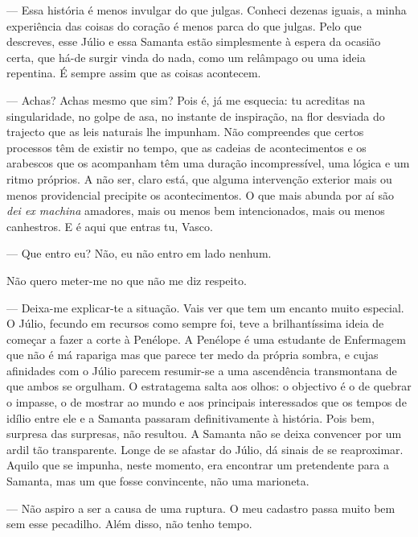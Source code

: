 --- Essa história é menos invulgar do que julgas. Conheci dezenas iguais,
  a minha experiência das coisas do coração é menos parca do que julgas.
  Pelo que descreves, esse Júlio e essa Samanta estão simplesmente à
  espera da ocasião certa, que há-de surgir vinda do nada, como um relâmpago ou uma ideia repentina. É
sempre assim que as coisas acontecem.

--- Achas? Achas mesmo que sim? Pois é, já me esquecia: tu acreditas na
  singularidade, no golpe de asa, no instante de inspiração, na flor
  desviada do trajecto que as leis naturais lhe impunham. Não
  compreendes que certos processos têm de existir no tempo, que as
  cadeias de acontecimentos e os arabescos que os acompanham têm uma
  duração incompressível, uma lógica e um ritmo próprios. A não ser,
  claro está, que alguma intervenção exterior mais ou menos providencial
  precipite os acontecimentos. O que mais abunda por aí são \emph{dei ex
  machina }amadores, mais ou menos bem intencionados, mais ou menos
  canhestros. E é aqui que entras tu, Vasco.

--- Que entro eu? Não, eu não entro em lado nenhum.

Não quero meter-me no que não me diz respeito.

--- Deixa-me explicar-te a situação. Vais ver que tem um encanto muito
especial. O Júlio, fecundo em recursos como sempre foi, teve a
brilhantíssima ideia de começar a fazer a corte à Penélope. A Penélope
é uma estudante de Enfermagem que não é má rapariga mas que parece ter
medo da própria sombra, e cujas afinidades com o Júlio parecem
resumir-se a uma ascendência transmontana de que ambos se orgulham. O
estratagema salta aos olhos: o objectivo é o de quebrar o impasse, o
de mostrar ao mundo e aos principais interessados
que os tempos de idílio entre ele e a Samanta passaram definitivamente
à história. Pois bem, surpresa das surpresas, não resultou. A Samanta
não se deixa convencer por um ardil tão transparente. Longe de se
afastar do Júlio, dá sinais de se reaproximar. Aquilo que se impunha,
neste momento, era encontrar um pretendente para a Samanta, mas um que
fosse convincente, não uma marioneta.

--- Não aspiro a ser a causa de uma ruptura. O meu cadastro passa muito
  bem sem esse pecadilho. Além disso, não tenho tempo.

